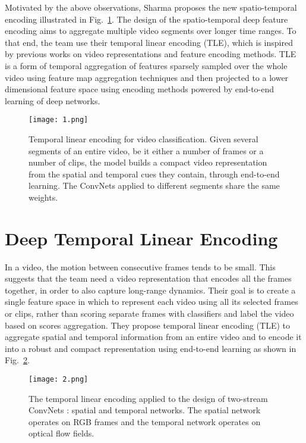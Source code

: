 \documentclass[10pt,twocolumn,letterpaper]{article}
\begin{document}
Motivated by the above observations, Sharma proposes the new spatio-temporal encoding \cite{diba2017deep} illustrated in Fig.~\ref{fig:1}. The design of the spatio-temporal deep feature encoding aims to aggregate multiple video segments over longer time ranges. To that end, the team use their temporal linear encoding (TLE), which is inspired by previous works on video representations \cite{wang2013action} and feature encoding methods. TLE is a form of temporal aggregation of features sparsely sampled over the whole video using feature map aggregation techniques and then projected to a lower dimensional feature space using encoding methods powered by end-to-end learning of deep networks.

\begin{figure}
	\begin{center}
		\texttt{[image: 1.png]}
	\end{center}
	\caption{Temporal linear encoding for video classification. Given several segments of an entire video, be it either a number of frames or a number of clips, the model builds a compact video representation from the spatial and temporal cues they contain, through end-to-end learning. The ConvNets applied to different segments share the same weights.}
	\label{fig:1}
\end{figure}

\section{Deep Temporal Linear Encoding}

In a video, the motion between consecutive frames tends to be small. This suggests that the team need a video representation that encodes all the frames together, in order to also capture long-range dynamics. Their goal is to create a single feature space in which to represent each video using all its selected frames or clips, rather than scoring separate frames with classifiers and label the video based on scores aggregation. They propose temporal linear encoding (TLE) to aggregate spatial and temporal information from an entire video and to encode it into a robust and compact representation using end-to-end learning as shown in Fig.~\ref{fig:2}.
\begin{figure}
	\begin{center}
		\texttt{[image: 2.png]}
	\end{center}
	\caption{The temporal linear encoding applied to the design of two-stream ConvNets \cite{simonyan2014two}: spatial and temporal networks. The spatial network operates on RGB frames and the temporal network operates on optical flow fields.}
	\label{fig:2}
\end{figure}
\end{document}
